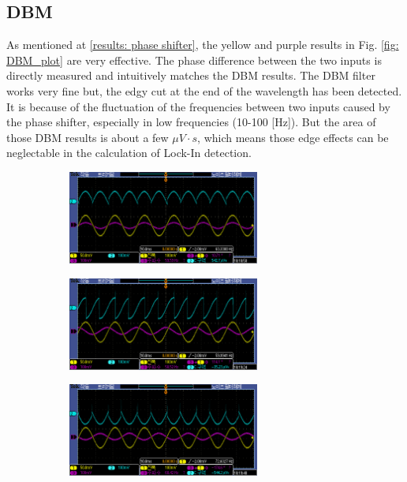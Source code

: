 \documentclass{article}
\begin{document}
\subsection{DBM}
As mentioned at \ref{results: phase shifter}, the yellow and purple results in Fig. \ref{fig: DBM_plot} are very effective.
The phase difference between the two inputs is directly measured and intuitively matches the DBM results.
The DBM filter works very fine but, the edgy cut at the end of the wavelength has been detected.
It is because of the fluctuation of the frequencies between two inputs caused by the phase shifter, especially in low frequencies (10-100 [Hz]).
But the area of those DBM results is about a few $\mu V \cdot s$, which means those edge effects can be neglectable in the calculation of Lock-In detection.

\begin{figure}[ht]
  \begin{subfigure}[b]{6.3cm}
      \centering
      \includegraphics[width=6.3cm]{../raw_data/TEK00355.PNG}
      \caption{}
  \end{subfigure}
  \hfill
  \begin{subfigure}[b]{6.3cm}
    \centering
    \includegraphics[width=6.3cm]{../raw_data/TEK00356.PNG}
    \caption{}
\end{subfigure}
\hfill
\begin{subfigure}[b]{6.3cm}
  \centering
  \includegraphics[width=6.3cm]{../raw_data/TEK00357.PNG}
  \caption{}
\end{subfigure}
\hfill

\end{figure}
\end{document}

